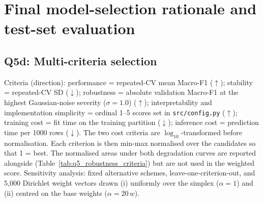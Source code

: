 \section{Final model-selection rationale and test-set evaluation}
\label{sec:final}

\subsection{Q5d: Multi-criteria selection}
Criteria (direction): performance = repeated-CV mean Macro-F1 ($\uparrow$); stability = repeated-CV SD
($\downarrow$); robustness = absolute validation Macro-F1 at the highest Gaussian-noise severity
($\sigma = 1.0$) ($\uparrow$); interpretability and implementation simplicity = ordinal 1--5 scores set in
\texttt{src/config.py} ($\uparrow$); training cost = fit time on the training partition ($\downarrow$);
inference cost = prediction time per 1000 rows ($\downarrow$). The two cost criteria are $\log_{10}$-transformed
before normalisation. Each criterion is then min-max normalised over the candidates so that 1 = best. The
normalised areas under both degradation curves are reported alongside (Table~\ref{tab:q5_robustness_criteria})
but are not used in the weighted score. Sensitivity analysis: fixed alternative schemes, leave-one-criterion-out,
and 5{,}000 Dirichlet weight vectors drawn (i) uniformly over the simplex ($\alpha = 1$) and (ii) centred on
the base weights ($\alpha = 20\,w$).

